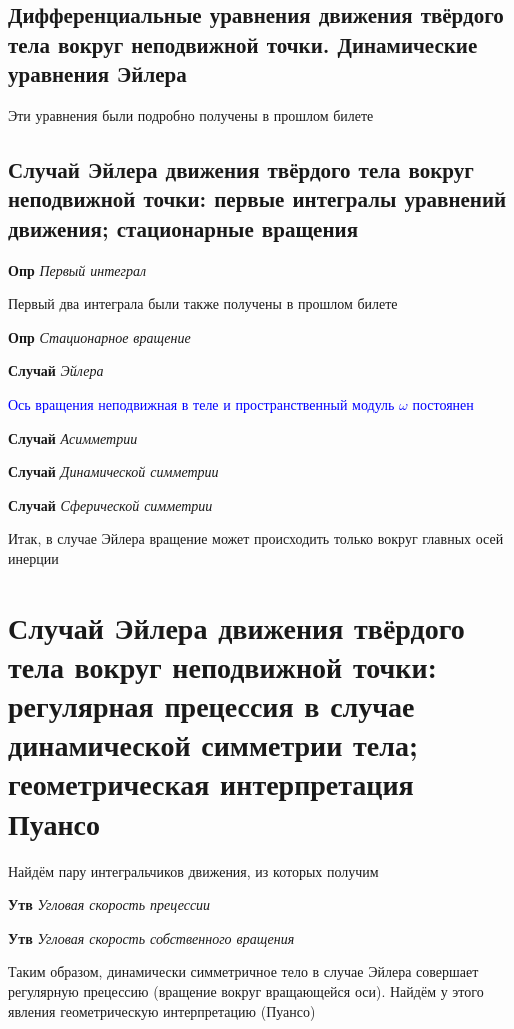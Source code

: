 \documentclass[a4paper, 14pt]{article}
\begin{document}
    \subsection{Дифференциальные уравнения движения твёрдого тела вокруг неподвижной точки. Динамические уравнения
    Эйлера}
    
    Эти уравнения были подробно получены в прошлом билете
    
    \subsection{Случай Эйлера движения твёрдого тела вокруг неподвижной точки: первые интегралы уравнений движения;
    стационарные вращения}
    
    \textbf{Опр} \textit{Первый интеграл}
    
    Первый два интеграла были также получены в прошлом билете
    
    \textbf{Опр} \textit{Стационарное вращение}
    
    \textbf{Случай} \textit{Эйлера}
    
    \textcolor{blue}{Ось вращения неподвижная в теле и пространственный модуль $\omega$ постоянен}
    
    \textbf{Случай} \textit{Асимметрии}
    
    \textbf{Случай} \textit{Динамической симметрии}
    
    \textbf{Случай} \textit{Сферической симметрии}
    
    Итак, в случае Эйлера вращение может происходить только вокруг главных осей инерции
    
    \section{Случай Эйлера движения твёрдого тела вокруг неподвижной точки: регулярная прецессия в случае
    динамической симметрии тела; геометрическая интерпретация Пуансо}
    
    Найдём пару интегральчиков движения, из которых получим
    
    \textbf{Утв} \textit{Угловая скорость прецессии}
    
    \textbf{Утв} \textit{Угловая скорость собственного вращения}
    
    Таким образом, динамически симметричное тело в случае Эйлера совершает регулярную прецессию (вращение вокруг
    вращающейся оси).
    Найдём у этого явления геометрическую интерпретацию (Пуансо)
    
\end{document}
